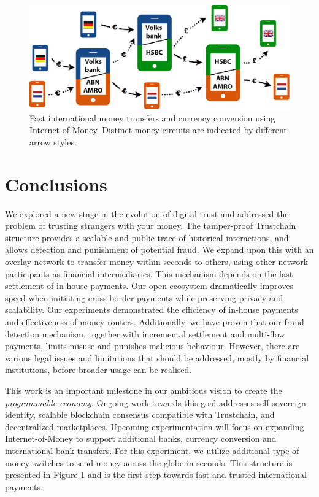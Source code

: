 
\begin{figure}[h]
	\centering
	\includegraphics[width=1\textwidth]{iom/assets/internet_of_money_network.png}
	\caption{Fast international money transfers and currency conversion using Internet-of-Money. Distinct money circuits are indicated by different arrow styles.}
	\label{fig:internet_of_money_network}
\end{figure}

\section{Conclusions}
We explored a new stage in the evolution of digital trust and addressed the problem of trusting strangers with your money.
The tamper-proof Trustchain structure provides a scalable and public trace of historical interactions, and allows detection and punishment of potential fraud.
We expand upon this with an overlay network to transfer money within seconds to others, using other network participants as financial intermediaries.
This mechanism depends on the fast settlement of in-house payments.
Our open ecosystem dramatically improves speed when initiating cross-border payments while preserving privacy and scalability.
Our experiments demonstrated the efficiency of in-house payments and effectiveness of money routers.
Additionally, we have proven that our fraud detection mechanism, together with incremental settlement and multi-flow payments, limits misuse and punishes malicious behaviour.
However, there are various legal issues and limitations that should be addressed, mostly by financial institutions, before broader usage can be realised.

This work is an important milestone in our ambitious vision to create the \emph{programmable economy}.
Ongoing work towards this goal addresses self-sovereign identity, scalable blockchain consensus compatible with Trustchain, and decentralized marketplaces.
Upcoming experimentation will focus on expanding Internet-of-Money to support additional banks, currency conversion and international bank transfers.
For this experiment, we utilize additional type of money switches to send money across the globe in seconds.
This structure is presented in Figure \ref{fig:internet_of_money_network} and is the first step towards fast and trusted international payments.
